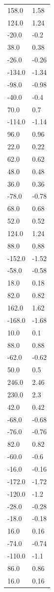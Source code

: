 \begin{longtable}{ll}
158.0 & 1.58 \\
124.0 & 1.24 \\
-20.0 & -0.2 \\
38.0 & 0.38 \\
-26.0 & -0.26 \\
-134.0 & -1.34 \\
-98.0 & -0.98 \\
-40.0 & -0.4 \\
70.0 & 0.7 \\
-114.0 & -1.14 \\
96.0 & 0.96 \\
22.0 & 0.22 \\
62.0 & 0.62 \\
48.0 & 0.48 \\
36.0 & 0.36 \\
-78.0 & -0.78 \\
68.0 & 0.68 \\
52.0 & 0.52 \\
124.0 & 1.24 \\
88.0 & 0.88 \\
-152.0 & -1.52 \\
-58.0 & -0.58 \\
18.0 & 0.18 \\
82.0 & 0.82 \\
162.0 & 1.62 \\
-168.0 & -1.68 \\
10.0 & 0.1 \\
88.0 & 0.88 \\
-62.0 & -0.62 \\
50.0 & 0.5 \\
246.0 & 2.46 \\
230.0 & 2.3 \\
42.0 & 0.42 \\
-68.0 & -0.68 \\
-76.0 & -0.76 \\
82.0 & 0.82 \\
-60.0 & -0.6 \\
-16.0 & -0.16 \\
-172.0 & -1.72 \\
-120.0 & -1.2 \\
-28.0 & -0.28 \\
-18.0 & -0.18 \\
16.0 & 0.16 \\
-74.0 & -0.74 \\
-110.0 & -1.1 \\
86.0 & 0.86 \\
16.0 & 0.16 \\

\end{longtable}
